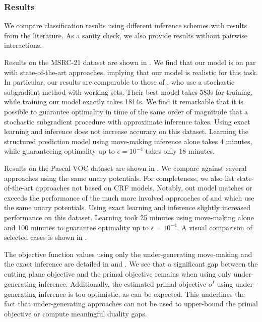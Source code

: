 

\subsubsection{Results}
We compare classification results using different inference schemes with
results from the literature. As a sanity check, we also provide results without
pairwise interactions.

Results on the MSRC-21 dataset are shown in .
We find that our model is on par with state-of-the-art approaches, implying
that our model is realistic for this task. In particular, our results are comparable to those of
\citet{lucchi2013learning}, who use a stochastic subgradient method with working sets.
Their best model takes 583s for training, while training our model exactly takes 1814s.
We find it remarkable that it is possible to guarantee optimality in time of
the same order of magnitude that a stochastic subgradient procedure with
approximate inference takes. Using exact learning and inference does not increase accuracy
on this dataset.
Learning the structured prediction model using move-making inference alone
takes 4 minutes, while guaranteeing optimality up to  $\epsilon=10^{-4}$
takes only 18 minutes.

Results on the Pascal-VOC dataset are shown in .
We compare against several approaches using the same unary potentials.
For completeness, we also list state-of-the-art approaches not based on CRF models.
Notably, out model matches or exceeds the performance of the much more involved approaches of
\citet{krahenbuhl2012efficient} and \citet{dann2012pottics} which use the same
unary potentials.
Using exact learning and inference slightly increased performance on this dataset.
Learning took 25 minutes using move-making alone and 100 minutes to guarantee optimality
up to $\epsilon=10^{-4}$.
A visual comparison of selected cases is shown in .


The objective function values using only the under-generating move-making and
the exact inference are detailed in  and .
We see that a significant gap between the cutting plane objective and the primal objective
remains when using only under-generating inference.
Additionally, the estimated primal objective $o^{\hat{I}}$ using under-generating inference is
too optimistic, as can be expected. This underlines the fact that
under-generating approaches can not be used to upper-bound the primal
objective or compute meaningful duality gaps.


